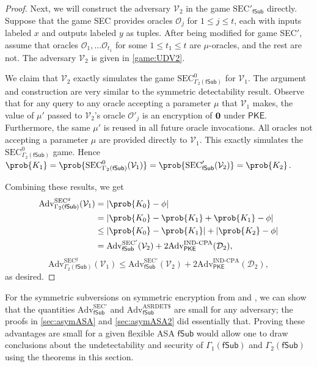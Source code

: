 \begin{proof}
Next, we will construct the adversary $\mathcal{V}_2$ in the game $\mathrm{SEC'}_{\mathsf{fSub}}$ directly. Suppose that the game SEC provides oracles $\mathcal{O}_j$ for $1\le j\le t$, each with inputs labeled $x$ and outputs labeled $y$ as tuples. After being modified for game SEC$'$, assume that oracles $\mathcal{O}_1, ... \mathcal{O}_{t_1}$ for some $1 \le t_1 \le t$ are $\mu$-oracles, and the rest are not. The adversary $\mathcal{V}_2$ is given in \autoref{game:UDV2}.

We claim that $\mathcal{V}_2$ exactly simulates the game $\mathrm{SEC}^0_{\Gamma_2(\mathsf{fSub})}$ for $\mathcal{V}_1$. The argument and construction are very similar to the symmetric detectability result. Observe that for any query to any oracle accepting a parameter $\mu$ that $\mathcal{V}_1$ makes, the value of $\mu'$ passed to $\mathcal{V}_2$'s oracle $\mathcal{O}'_j$ is an encryption of $\bf{0}$ under $\mathsf{PKE}$. Furthermore, the same $\mu'$ is reused in all future oracle invocations. All oracles not accepting a parameter $\mu$ are provided directly to $\mathcal{V}_1$. This exactly simulates the $\mathrm{SEC}^0_{\Gamma_2(\mathsf{fSub})}$ game. Hence $\prob{K_1}=\prob{\mathrm{SEC}^0_{\Gamma_2(\mathsf{fSub})}(\mathcal{V}_1)}=\prob{\mathrm{SEC}'_{\mathsf{fSub}}(\mathcal{V}_2)}=\prob{K_2}$.

Combining these results, we get
\iffullversion
\begin{align*}
\mathrm{Adv}^{\mathrm{SEC}^g}_{\Gamma_2(\mathsf{fSub})}(\mathcal{V}_1)
&= |\prob{K_0}-\phi| \\
&= |\prob{K_0}-\prob{K_1}+\prob{K_1}-\phi| \\
&\le |\prob{K_0}-\prob{K_1}|+|\prob{K_2}-\phi| \\
&= \mathrm{Adv}^{\mathrm{SEC'}}_{\mathsf{fSub}}(\mathcal{V}_2) + 2\mathrm{Adv}^{\mathrm{IND}\text{-}\mathrm{CPA}}_\mathsf{PKE}(\mathcal{D}_2),
\end{align*}
\else
\[
\mathrm{Adv}^{\mathrm{SEC}^g}_{\Gamma_2(\mathsf{fSub})}(\mathcal{V}_1) \le \mathrm{Adv}^{\mathrm{SEC'}}_{\mathsf{fSub}}(\mathcal{V}_2) + 2\mathrm{Adv}^{\mathrm{IND}\text{-}\mathrm{CPA}}_\mathsf{PKE}(\mathcal{D}_2),
\]
\fi
as desired.
\end{proof}

For the symmetric subversions on symmetric encryption from \cite{C:BelPatRog14} and \cite{CCS:BelJaeKan15}, we can show that the quantities $\mathrm{Adv}^{\mathrm{SEC'}}_{\mathsf{fSub}}$ and $\mathrm{Adv}^{\mathrm{ASRDET}\$}_{\mathsf{fSub}}$ are small for any adversary; the proofs in \autoref{sec:asymASA} and \autoref{sec:asymASA2} did essentially that. Proving these advantages are small for a given flexible ASA $\mathsf{fSub}$ would allow one to draw conclusions about the undetectability and security of $\Gamma_1(\mathsf{fSub})$ and $\Gamma_2(\mathsf{fSub})$ using the theorems in this section.